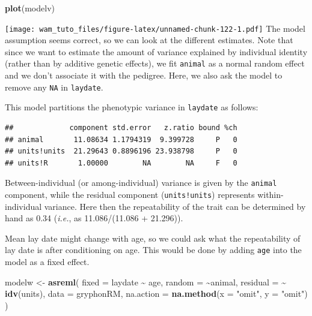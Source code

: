 \documentclass[
  12pt,
]{book}
\newenvironment{Shaded}{\begin{snugshade}}{\end{snugshade}}
\newcommand{\DataTypeTok}[1]{\textcolor[rgb]{0.13,0.29,0.53}{#1}}
\newcommand{\KeywordTok}[1]{\textcolor[rgb]{0.13,0.29,0.53}{\textbf{#1}}}
\newcommand{\NormalTok}[1]{#1}
\newcommand{\OperatorTok}[1]{\textcolor[rgb]{0.81,0.36,0.00}{\textbf{#1}}}
\newcommand{\StringTok}[1]{\textcolor[rgb]{0.31,0.60,0.02}{#1}}
\begin{document}
\begin{Shaded}
\begin{Highlighting}[]
\KeywordTok{plot}\NormalTok{(modelv)}
\end{Highlighting}
\end{Shaded}

\texttt{[image: wam\_tuto\_files/figure-latex/unnamed-chunk-122-1.pdf]}
The model assumption seems correct, so we can look at the different estimates.
Note that since we want to estimate the amount of variance explained by individual identity (rather than by additive genetic effects), we fit \texttt{animal} as a normal random effect and we don't associate it with the pedigree.
Here, we also ask the model to remove any \texttt{NA} in \texttt{laydate}.

This model partitions the phenotypic variance in \texttt{laydate} as follows:

\begin{Shaded}
\end{Shaded}

\begin{verbatim}
##             component std.error   z.ratio bound %ch
## animal       11.08634 1.1794319  9.399728     P   0
## units!units  21.29643 0.8896196 23.938798     P   0
## units!R       1.00000        NA        NA     F   0
\end{verbatim}

Between-individual (or among-individual) variance is given by the \texttt{animal} component, while the residual component (\texttt{units!units}) represents within-individual variance. Here then the repeatability of the trait can be determined by hand as 0.34 (\emph{i.e.}, as 11.086/(11.086 + 21.296)).

Mean lay date might change with age, so we could ask what the repeatability of lay date is after conditioning on age. This would be done by adding \texttt{age} into the model as a fixed effect.

\begin{Shaded}
\begin{Highlighting}[]
\NormalTok{modelw \textless{}{-}}\StringTok{ }\KeywordTok{asreml}\NormalTok{(}
  \DataTypeTok{fixed =}\NormalTok{ laydate }\OperatorTok{\textasciitilde{}}\StringTok{ }\NormalTok{age,}
  \DataTypeTok{random =} \OperatorTok{\textasciitilde{}}\NormalTok{animal,}
  \DataTypeTok{residual =} \OperatorTok{\textasciitilde{}}\StringTok{ }\KeywordTok{idv}\NormalTok{(units),}
  \DataTypeTok{data =}\NormalTok{ gryphonRM,}
  \DataTypeTok{na.action =} \KeywordTok{na.method}\NormalTok{(}\DataTypeTok{x =} \StringTok{"omit"}\NormalTok{, }\DataTypeTok{y =} \StringTok{"omit"}\NormalTok{)}
\NormalTok{)}
\end{Highlighting}
\end{Shaded}
\end{document}
